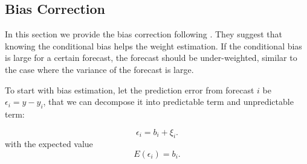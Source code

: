 \documentclass[11pt]{article}
\begin{document}

\subsection{Bias Correction}\label{bias-correction}
In this section we provide the bias correction following \cite{Gibbs2017}. They suggest that knowing the conditional bias helps the weight estimation. If the conditional bias is large for a certain forecast, the forecast should be under-weighted, similar to the case where the variance of the forecast is large.

To start with bias estimation, let the prediction error from forecast \(i\) be \(\epsilon_i = y - y_i\), that we can decompose it into predictable term and unpredictable term:

\begin{equation}
\label{eqn: w bias assumption}
\epsilon_i = b_i + \xi_i. 
\end{equation}
with the expected value
\begin{equation}
\label{eqn: bias estimate}
E(\epsilon_i) = b_i.
\end{equation}
\end{document}
